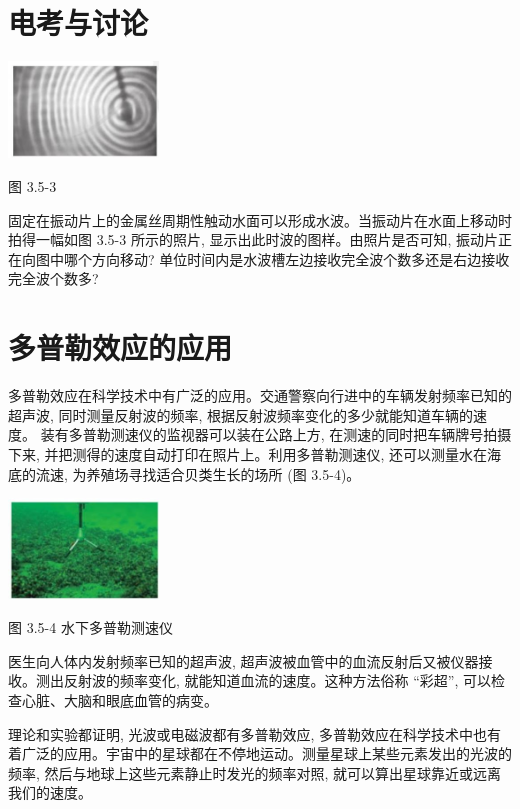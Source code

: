 \documentclass[10pt]{article}
\begin{document}
\section*{电考与讨论}

\begin{center}
\includegraphics[max width=0.3\textwidth]{images/01910e4c-ebb8-7d2c-8f2f-2375bc1d2d12_85_608310.jpg}
\end{center}

图 3.5-3

固定在振动片上的金属丝周期性触动水面可以形成水波。当振动片在水面上移动时拍得一幅如图 3.5-3 所示的照片, 显示出此时波的图样。由照片是否可知, 振动片正在向图中哪个方向移动? 单位时间内是水波槽左边接收完全波个数多还是右边接收完全波个数多?

\section*{多普勒效应的应用}

多普勒效应在科学技术中有广泛的应用。交通警察向行进中的车辆发射频率已知的超声波, 同时测量反射波的频率, 根据反射波频率变化的多少就能知道车辆的速度。 装有多普勒测速仪的监视器可以装在公路上方, 在测速的同时把车辆牌号拍摄下来, 并把测得的速度自动打印在照片上。利用多普勒测速仪, 还可以测量水在海底的流速, 为养殖场寻找适合贝类生长的场所 (图 3.5-4)。

\begin{center}
\includegraphics[max width=0.3\textwidth]{images/01910e4c-ebb8-7d2c-8f2f-2375bc1d2d12_86_239349.jpg}
\end{center}

图 3.5-4 水下多普勒测速仪

医生向人体内发射频率已知的超声波, 超声波被血管中的血流反射后又被仪器接收。测出反射波的频率变化, 就能知道血流的速度。这种方法俗称 “彩超”, 可以检查心脏、大脑和眼底血管的病变。

理论和实验都证明, 光波或电磁波都有多普勒效应, 多普勒效应在科学技术中也有着广泛的应用。宇宙中的星球都在不停地运动。测量星球上某些元素发出的光波的频率, 然后与地球上这些元素静止时发光的频率对照, 就可以算出星球靠近或远离我们的速度。
\end{document}

